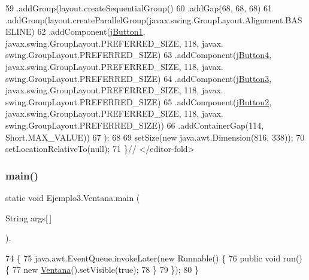 \begin{DoxyCode}
59             .addGroup(layout.createSequentialGroup()
60                 .addGap(68, 68, 68)
61                 .addGroup(layout.createParallelGroup(javax.swing.GroupLayout.Alignment.BASELINE)
62                     .addComponent(\mbox{\hyperlink{class_ejemplo3_1_1_ventana_a9c9557e7e1d01b6a2c59303420a82960}{jButton1}}, javax.swing.GroupLayout.PREFERRED\_SIZE, 118, javax.
      swing.GroupLayout.PREFERRED\_SIZE)
63                     .addComponent(\mbox{\hyperlink{class_ejemplo3_1_1_ventana_a22a478dbd87be7d99b7972cf00dbbf26}{jButton4}}, javax.swing.GroupLayout.PREFERRED\_SIZE, 118, javax.
      swing.GroupLayout.PREFERRED\_SIZE)
64                     .addComponent(\mbox{\hyperlink{class_ejemplo3_1_1_ventana_ad5cc36db674ee054410bb5d33de59124}{jButton3}}, javax.swing.GroupLayout.PREFERRED\_SIZE, 118, javax.
      swing.GroupLayout.PREFERRED\_SIZE)
65                     .addComponent(\mbox{\hyperlink{class_ejemplo3_1_1_ventana_a57fb2c553f7b9dfe7b817d42e931d02d}{jButton2}}, javax.swing.GroupLayout.PREFERRED\_SIZE, 118, javax.
      swing.GroupLayout.PREFERRED\_SIZE))
66                 .addContainerGap(114, Short.MAX\_VALUE))
67         );
68  
69         setSize(\textcolor{keyword}{new} java.awt.Dimension(816, 338));
70         setLocationRelativeTo(null);
71     \}\textcolor{comment}{// </editor-fold>}
\end{DoxyCode}
\mbox{\label{class_ejemplo3_1_1_ventana_a631699b39a0d1b90df30be894781bb0e}} 
\subsubsection{\texorpdfstring{main()}{main()}}
{\footnotesize\ttfamily static void Ejemplo3.\+Ventana.\+main (\begin{DoxyParamCaption}\item[{String}]{args\mbox{[}$\,$\mbox{]} }\end{DoxyParamCaption})\hspace{0.3cm}{\ttfamily [inline]}, {\ttfamily [static]}}


\begin{DoxyCode}
74     \{
75         java.awt.EventQueue.invokeLater(\textcolor{keyword}{new} Runnable() \{
76             \textcolor{keyword}{public} \textcolor{keywordtype}{void} run() \{
77                 \textcolor{keyword}{new} \mbox{\hyperlink{class_ejemplo3_1_1_ventana_a3f6d615323f128823ee69f37072074be}{Ventana}}().setVisible(\textcolor{keyword}{true});
78             \}
79         \});
80     \}
\end{DoxyCode}


